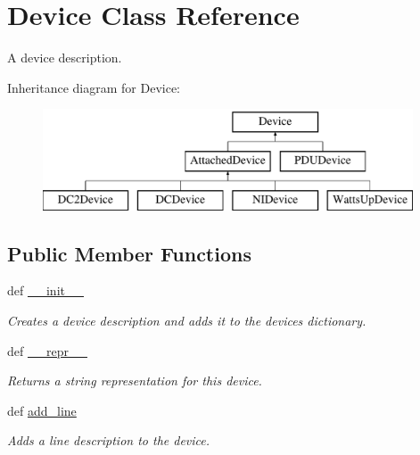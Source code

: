 \hypertarget{classsettings__classes_1_1_device}{\section{\-Device \-Class \-Reference}
\label{classsettings__classes_1_1_device}
}


\-A device description.  


\-Inheritance diagram for \-Device\-:\begin{figure}[H]
\begin{center}
\leavevmode
\includegraphics[height=3.000000cm]{classsettings__classes_1_1_device}
\end{center}
\end{figure}
\subsection*{\-Public \-Member \-Functions}
\begin{DoxyCompactItemize}
\item 
def \hyperlink{classsettings__classes_1_1_device_ac775ee34451fdfa742b318538164070e}{\-\_\-\-\_\-init\-\_\-\-\_\-}
\begin{DoxyCompactList}\small\item\em \-Creates a device description and adds it to the devices dictionary. \end{DoxyCompactList}\item 
def \hyperlink{classsettings__classes_1_1_device_ad8b9328939df072e4740cd9a63189744}{\-\_\-\-\_\-repr\-\_\-\-\_\-}
\begin{DoxyCompactList}\small\item\em \-Returns a string representation for this device. \end{DoxyCompactList}\item 
def \hyperlink{classsettings__classes_1_1_device_a9b24e7f6a176430603b1aec4ead55473}{add\-\_\-line}
\begin{DoxyCompactList}\small\item\em \-Adds a line description to the device. \end{DoxyCompactList}\end{DoxyCompactItemize}
